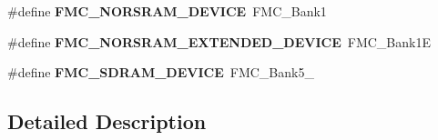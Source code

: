 \begin{DoxyCompactItemize}
\item 
\#define {\bfseries F\+M\+C\+\_\+\+N\+O\+R\+S\+R\+A\+M\+\_\+\+D\+E\+V\+I\+CE}~F\+M\+C\+\_\+\+Bank1\hypertarget{group___f_m_c___l_l___alias__definition_ga9c2af2ebad5bc8404a246fa7b2f0b926}{}\label{group___f_m_c___l_l___alias__definition_ga9c2af2ebad5bc8404a246fa7b2f0b926}

\item 
\#define {\bfseries F\+M\+C\+\_\+\+N\+O\+R\+S\+R\+A\+M\+\_\+\+E\+X\+T\+E\+N\+D\+E\+D\+\_\+\+D\+E\+V\+I\+CE}~F\+M\+C\+\_\+\+Bank1E\hypertarget{group___f_m_c___l_l___alias__definition_ga3c82a799431ec0d711161bb1277c9a0b}{}\label{group___f_m_c___l_l___alias__definition_ga3c82a799431ec0d711161bb1277c9a0b}

\item 
\#define {\bfseries F\+M\+C\+\_\+\+S\+D\+R\+A\+M\+\_\+\+D\+E\+V\+I\+CE}~F\+M\+C\+\_\+\+Bank5\+\_\hypertarget{group___f_m_c___l_l___alias__definition_ga1071d01ea617b4dc4823a095e3670260}{}\label{group___f_m_c___l_l___alias__definition_ga1071d01ea617b4dc4823a095e3670260}

\end{DoxyCompactItemize}


\subsection{Detailed Description}
